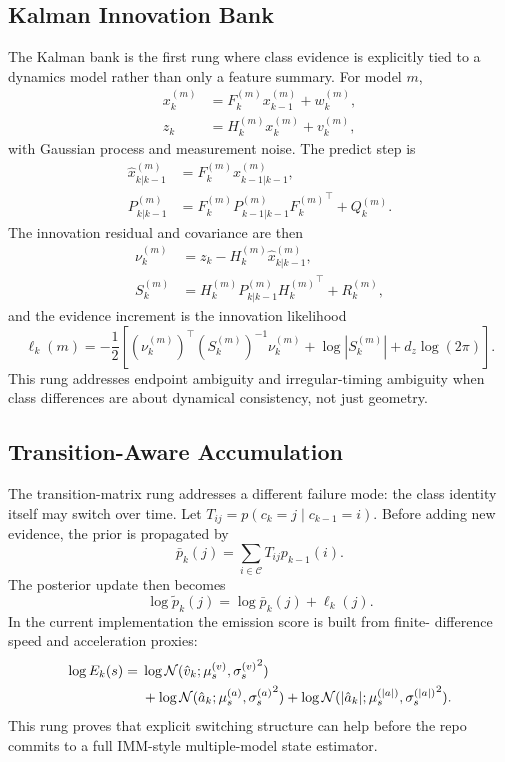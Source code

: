 \documentclass[11pt]{article}
\begin{document}
\subsection{Kalman Innovation Bank}
The Kalman bank is the first rung where class evidence is explicitly tied to a
dynamics model rather than only a feature summary. For model \(m\),
\begin{align}
x_k^{(m)} &= F_k^{(m)} x_{k-1}^{(m)} + w_k^{(m)}, \\
z_k &= H_k^{(m)} x_k^{(m)} + v_k^{(m)},
\end{align}
with Gaussian process and measurement noise. The predict step is
\begin{align}
\hat{x}_{k|k-1}^{(m)} &= F_k^{(m)} x_{k-1|k-1}^{(m)}, \\
P_{k|k-1}^{(m)} &= F_k^{(m)} P_{k-1|k-1}^{(m)} {F_k^{(m)}}^\top + Q_k^{(m)}.
\end{align}
The innovation residual and covariance are then
\begin{align}
\nu_k^{(m)} &= z_k - H_k^{(m)} \hat{x}_{k|k-1}^{(m)}, \\
S_k^{(m)} &= H_k^{(m)} P_{k|k-1}^{(m)} {H_k^{(m)}}^\top + R_k^{(m)},
\end{align}
and the evidence increment is the innovation likelihood
\begin{equation}
\ell_k(m)
=
-\frac{1}{2}
\left[
(\nu_k^{(m)})^\top (S_k^{(m)})^{-1}\nu_k^{(m)}
+
\log |S_k^{(m)}|
+
d_z \log(2\pi)
\right].
\end{equation}
This rung addresses endpoint ambiguity and irregular-timing ambiguity when
class differences are about dynamical consistency, not just geometry.

\subsection{Transition-Aware Accumulation}
The transition-matrix rung addresses a different failure mode: the class
identity itself may switch over time. Let \(T_{ij} = p(c_k=j \mid c_{k-1}=i)\).
Before adding new evidence, the prior is propagated by
\begin{equation}
\bar{p}_k(j) = \sum_{i \in \mathcal{C}} T_{ij} p_{k-1}(i).
\end{equation}
The posterior update then becomes
\begin{equation}
\log \tilde{p}_k(j) = \log \bar{p}_k(j) + \ell_k(j).
\end{equation}
In the current implementation the emission score is built from finite-
difference speed and acceleration proxies:
\begin{align}
\log E_k(s)
=\;&
\log \mathcal{N}(\hat{v}_k; \mu_s^{(v)}, {\sigma_s^{(v)}}^2)
\notag \\
&+
\log \mathcal{N}(\hat{a}_k; \mu_s^{(a)}, {\sigma_s^{(a)}}^2)
+
\log \mathcal{N}(|\hat{a}_k|; \mu_s^{(|a|)}, {\sigma_s^{(|a|)}}^2).
\end{align}
This rung proves that explicit switching structure can help before the repo
commits to a full IMM-style multiple-model state estimator.
\end{document}
